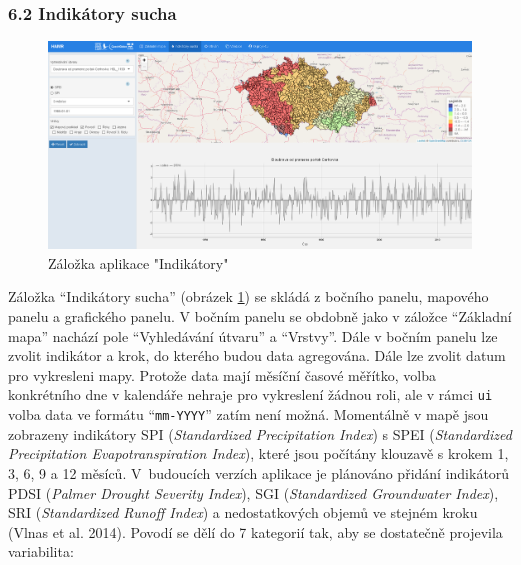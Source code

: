 \documentclass[12pt,]{article}
\begin{document}
\subsubsection{6.2 Indikátory sucha}\label{indikatory-sucha}

\begin{figure}[H]
      \includegraphics[width=\textwidth]{fig/P_indikatory}
      \caption{Záložka aplikace "Indikátory"}
      \label{fig:ch5.4}
\end{figure}

\vspace*{-0.3cm}

\qquad Záložka \enquote{Indikátory sucha} (obrázek \ref{fig:ch5.4}) se
skládá z bočního panelu, mapového panelu a grafického panelu. V bočním
panelu se obdobně jako v záložce \enquote{Základní mapa} nachází pole
\enquote{Vyhledávání útvaru} a \enquote{Vrstvy}. Dále v bočním panelu
lze zvolit indikátor a krok, do kterého budou data agregována. Dále lze
zvolit datum pro vykresleni mapy. Protože data mají měsíční časové
měřítko, volba konkrétního dne v kalendáře nehraje pro vykreslení žádnou
roli, ale v rámci \texttt{ui} volba data ve formátu
\enquote{\texttt{mm-YYYY}} zatím není možná. Momentálně v mapě jsou
zobrazeny indikátory SPI (\emph{Standardized Precipitation Index}) s
SPEI (\emph{Standardized Precipitation Evapotranspiration Index}), které
jsou počítány klouzavě s krokem 1, 3, 6, 9 a 12 měsíců. V~budoucích
verzích aplikace je plánováno přidání indikátorů PDSI (\emph{Palmer
Drought Severity Index}), SGI (\emph{Standardized Groundwater Index}),
SRI (\emph{Standardized Runoff Index}) a nedostatkových objemů ve
stejném kroku (Vlnas et al. 2014). Povodí se dělí do 7 kategorií tak,
aby se dostatečně projevila variabilita:
\end{document}
